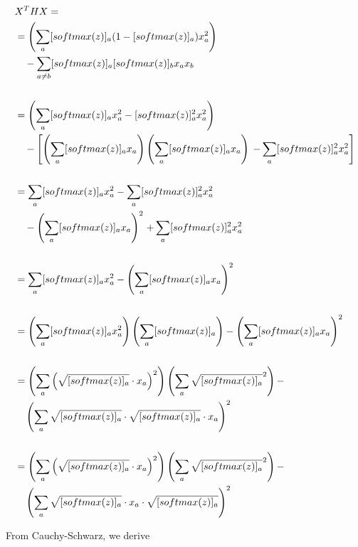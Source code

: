 \documentclass[10pt]{article}
\newcommand{\softmax}[1]{ [softmax(z)]_{#1} }
\begin{document}
\begin{equation}
\begin{aligned}
  & X^{T}HX = {} \\ & = \left( \sum_{a}\softmax{a}
					(1-\softmax{a})x_{a}^{2}\right) \\
					&\quad -\sum_{a \neq b}
						\softmax{a}\softmax{b}x_{a}x_{b}
  \\ \\ &
  = \left( \sum_{a}\softmax{a}x_{a}^{2}
					- \softmax{a}^{2}x_{a}^{2}\right) \\
					&\quad-\left[
						\left( 
							\sum_{a}\softmax{a}x_{a}
						\right)
						\left(
							\sum_{a}\softmax{a}x_{a}
						\right) \right.
						\left. - \sum_{a}
									\softmax{a}^{2}x_{a}^{2}
								\vphantom{\left(\sum\right)}
						 \right]
  \\ \\ &
  = \sum_{a}\softmax{a}x_{a}^{2} - \sum_{a}\softmax{a}^{2}x_{a}^{2} \\
					&\quad
            -\left(\sum_{a}\softmax{a}x_{a}\right)^{2}
						\left. + \sum_{a}
									\softmax{a}^{2}x_{a}^{2}
								\vphantom{\left(\sum\right)}
						 \right.
  \\ \\ &
  = \sum_{a}\softmax{a}x_{a}^2 -
					\left( \sum_{a}\softmax{a}x_{a}\right)^2
  \\ \\ &
  = \left(\sum_{a}\softmax{a}x_{a}^2\right)
					\left(\sum_{a}\softmax{a}\right) -
					\left(\sum_{a}\softmax{a}x_{a}\right)^2
  \\ \\ &
  = \left(\sum_{a}\left(\sqrt{\softmax{a}}\cdot x_{a}\right)^2\right)
					\left(\sum_{a}\sqrt{\softmax{a}}^2\right) - \\
					&\quad \left( \sum_{a}
						\sqrt{\softmax{a}}\cdot
						\sqrt{\softmax{a}}\cdot x_{a}\right)^2
  \\ \\ &
  = \left(\sum_{a}\left(\sqrt{\softmax{a}}\cdot x_{a}\right)^2\right)
					\left(\sum_{a}\sqrt{\softmax{a}}^2\right) - \\
					&\quad \left( \sum_{a}
						\sqrt{\softmax{a}}\cdot x_{a}\cdot
						\sqrt{\softmax{a}}\right)^2
\end{aligned}
\end{equation}


From Cauchy-Schwarz, we derive
\end{document}
